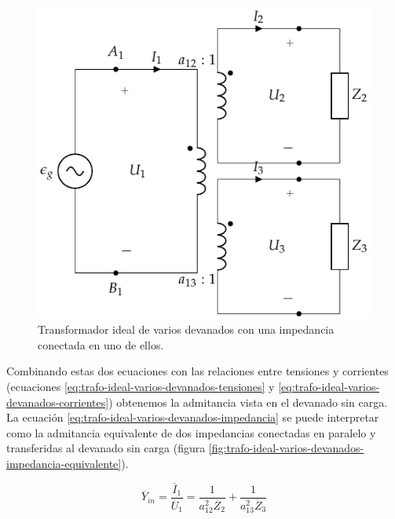 \begin{figure}
  \centering
  \includegraphics[height=0.25\textheight]{../figs/TrafoIdealVariosDevanados_Impedancia.pdf}
  \caption{Transformador ideal de varios devanados con una impedancia conectada en uno de ellos.}
  \label{fig:trafo-ideal-varios-devanados-impedancia}
\end{figure}

Combinando estas dos ecuaciones con las relaciones entre tensiones y corrientes (ecuaciones \ref{eq:trafo-ideal-varios-devanados-tensiones} y \ref{eq:trafo-ideal-varios-devanados-corrientes}) obtenemos la admitancia vista en el devanado sin carga. La ecuación \ref{eq:trafo-ideal-varios-devanados-impedancia} se puede interpretar como la admitancia equivalente de dos impedancias conectadas en paralelo y transferidas al devanado sin carga (figura \ref{fig:trafo-ideal-varios-devanados-impedancia-equivalente}).

\begin{equation}
  \label{eq:trafo-ideal-varios-devanados-impedancia}
  \overline{Y}_{in} = \frac{\overline{I}_1}{\overline{U}_1} = 
    \frac{1}{a^2_{12} \overline{Z}_2} + \frac{1}{a^2_{13}
      \overline{Z}_3}
\end{equation}

